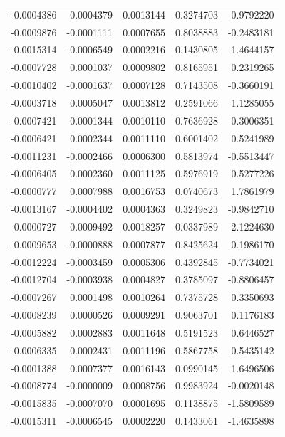 \documentclass[]{tufte-handout}
\begin{document}
\begin{longtable}[]{@{}rrrrr@{}}
-0.0004386 & 0.0004379 & 0.0013144 & 0.3274703 & 0.9792220 \\
-0.0009876 & -0.0001111 & 0.0007655 & 0.8038883 & -0.2483181 \\
-0.0015314 & -0.0006549 & 0.0002216 & 0.1430805 & -1.4644157 \\
-0.0007728 & 0.0001037 & 0.0009802 & 0.8165951 & 0.2319265 \\
-0.0010402 & -0.0001637 & 0.0007128 & 0.7143508 & -0.3660191 \\
-0.0003718 & 0.0005047 & 0.0013812 & 0.2591066 & 1.1285055 \\
-0.0007421 & 0.0001344 & 0.0010110 & 0.7636928 & 0.3006351 \\
-0.0006421 & 0.0002344 & 0.0011110 & 0.6001402 & 0.5241989 \\
-0.0011231 & -0.0002466 & 0.0006300 & 0.5813974 & -0.5513447 \\
-0.0006405 & 0.0002360 & 0.0011125 & 0.5976919 & 0.5277226 \\
-0.0000777 & 0.0007988 & 0.0016753 & 0.0740673 & 1.7861979 \\
-0.0013167 & -0.0004402 & 0.0004363 & 0.3249823 & -0.9842710 \\
0.0000727 & 0.0009492 & 0.0018257 & 0.0337989 & 2.1224630 \\
-0.0009653 & -0.0000888 & 0.0007877 & 0.8425624 & -0.1986170 \\
-0.0012224 & -0.0003459 & 0.0005306 & 0.4392845 & -0.7734021 \\
-0.0012704 & -0.0003938 & 0.0004827 & 0.3785097 & -0.8806457 \\
-0.0007267 & 0.0001498 & 0.0010264 & 0.7375728 & 0.3350693 \\
-0.0008239 & 0.0000526 & 0.0009291 & 0.9063701 & 0.1176183 \\
-0.0005882 & 0.0002883 & 0.0011648 & 0.5191523 & 0.6446527 \\
-0.0006335 & 0.0002431 & 0.0011196 & 0.5867758 & 0.5435142 \\
-0.0001388 & 0.0007377 & 0.0016143 & 0.0990145 & 1.6496506 \\
-0.0008774 & -0.0000009 & 0.0008756 & 0.9983924 & -0.0020148 \\
-0.0015835 & -0.0007070 & 0.0001695 & 0.1138875 & -1.5809589 \\
-0.0015311 & -0.0006545 & 0.0002220 & 0.1433061 & -1.4635898 \\
\bottomrule
\end{longtable}
\end{document}
